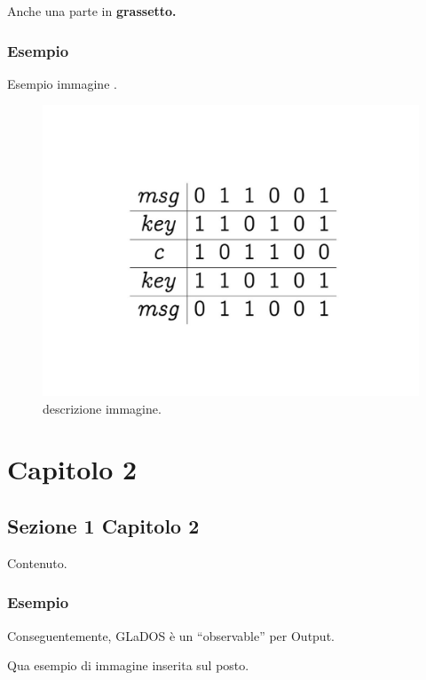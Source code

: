 \documentclass[a4paper,12pt]{report}
\begin{document}
Anche una parte in \textbf{grassetto.}

\subsection*{Esempio}
Esempio immagine .

\begin{figure}[H]
\centering{}
\includegraphics{img/example_img.pdf}
\caption{descrizione immagine.}
\label{img:example}
\end{figure}

\chapter{Capitolo 2}

\section{Sezione 1 Capitolo 2}

Contenuto.

\subsection*{Esempio}
Conseguentemente, GLaDOS è un ``observable'' per Output.

Qua esempio di immagine inserita sul posto.
\end{document}
